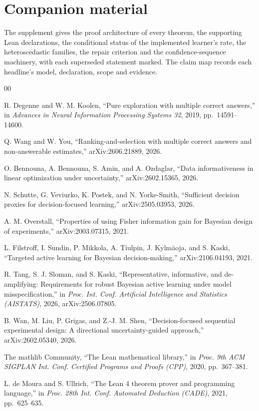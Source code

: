 \section*{Companion material}
The supplement gives the proof architecture of every theorem, the supporting Lean declarations,
the conditional status of the implemented learner's rate, the heteroscedastic families, the
repair criterion and the confidence-sequence machinery, with each superseded statement marked.
The claim map records each headline's model, declaration, scope and evidence.

\begin{thebibliography}{00}

 R. Degenne and W. M. Koolen, ``Pure exploration with multiple correct
answers,'' in \emph{Advances in Neural Information Processing Systems 32}, 2019,
pp.~14591--14600.

 Q. Wang and W. You, ``Ranking-and-selection with multiple correct
answers and non-answerable estimates,'' arXiv:2606.21889, 2026.

 O. Bennouna, A. Bennouna, S. Amin, and A. Ozdaglar, ``Data
informativeness in linear optimization under uncertainty,'' arXiv:2602.15365, 2026.

 N. Schutte, G. Veviurko, K. Postek, and N. Yorke-Smith, ``Sufficient
decision proxies for decision-focused learning,'' arXiv:2505.03953, 2026.

 A. M. Overstall, ``Properties of using Fisher information gain for
Bayesian design of experiments,'' arXiv:2003.07315, 2021.

 L. Filstroff, I. Sundin, P. Mikkola, A. Tiulpin, J. Kylm\"{a}oja,
and S. Kaski, ``Targeted active learning for Bayesian decision-making,'' arXiv:2106.04193,
2021.

 R. Tang, S. J. Sloman, and S. Kaski, ``Representative, informative, and
de-amplifying: Requirements for robust Bayesian active learning under model misspecification,''
in \emph{Proc. Int. Conf. Artificial Intelligence and Statistics (AISTATS)}, 2026,
arXiv:2506.07805.

 B. Wan, M. Liu, P. Grigas, and Z.-J. M. Shen, ``Decision-focused
sequential experimental design: A directional uncertainty-guided approach,'' arXiv:2602.05340,
2026.

 The mathlib Community, ``The Lean mathematical library,'' in
\emph{Proc. 9th ACM SIGPLAN Int. Conf. Certified Programs and Proofs (CPP)}, 2020,
pp.~367--381.

 L. de Moura and S. Ullrich, ``The Lean 4 theorem prover and
programming language,'' in \emph{Proc. 28th Int. Conf. Automated Deduction (CADE)}, 2021,
pp.~625--635.

\end{thebibliography}


